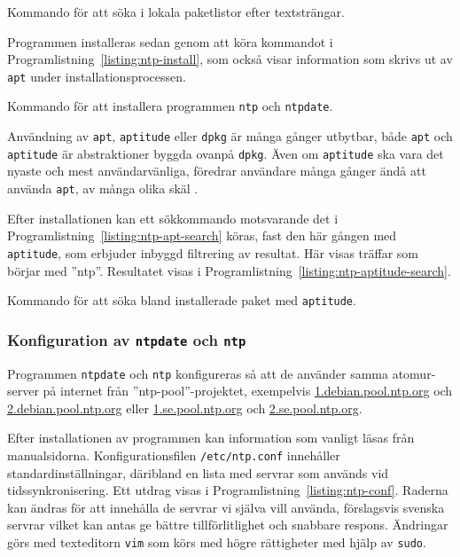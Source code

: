 \begin{listing}[H]
\caption{Kommando för att söka i lokala paketlistor efter textsträngar.}
\label{listing:ntp-apt-search}
\end{listing}


Programmen installeras sedan genom att köra kommandot i
Programlistning~\ref{listing:ntp-install}, som också visar information som skrivs
ut av \texttt{apt} under installationsprocessen.

\begin{listing}[H]
\caption{Kommando för att installera programmen \texttt{ntp} och \texttt{ntpdate}.}
\label{listing:ntp-install}
\end{listing}


Användning av \texttt{apt}, \texttt{aptitude} eller
\texttt{dpkg} är många gånger utbytbar, både \texttt{apt} och \texttt{aptitude}
är abstraktioner byggda ovanpå \texttt{dpkg}. Även om \texttt{aptitude} ska vara
det nyaste och mest användarvänliga, föredrar användare många gånger ändå
att använda \texttt{apt}, av många olika skäl \cite{superuser:aptitude-apt}.

Efter installationen kan ett sökkommando motsvarande det i
Programlistning~\ref{listing:ntp-apt-search} köras, fast den här gången med
\texttt{aptitude}, som erbjuder inbyggd filtrering av resultat. Här visas
träffar som börjar med ''ntp''. Resultatet visas i
Programlistning~\ref{listing:ntp-aptitude-search}.

\begin{listing}[H]
\caption{Kommando för att söka bland installerade paket med \texttt{aptitude}.}
\label{listing:ntp-aptitude-search}
\end{listing}

\subsubsection{Konfiguration av \texttt{ntpdate} och \texttt{ntp}}
Programmen \texttt{ntpdate} och \texttt{ntp} konfigureras så att de använder
samma atomur-server på internet från ''ntp-pool''-projektet, exempelvis
\url{1.debian.pool.ntp.org} och \url{2.debian.pool.ntp.org} eller
\url{1.se.pool.ntp.org} och \url{2.se.pool.ntp.org}.

Efter installationen av programmen kan information som vanligt läsas från
manualsidorna. Konfigurationsfilen \texttt{/etc/ntp.conf} innehåller
standardinställningar, däribland en lista med servrar som används vid
tidssynkronisering. Ett utdrag visas i Programlistning~\ref{listing:ntp-conf}.
Raderna kan ändras för att innehålla de servrar vi själva vill använda,
förslagsvis svenska servrar vilket kan antas ge bättre tillförlitlighet och
snabbare respons. Ändringar görs med texteditorn \texttt{vim} som körs med
högre rättigheter med hjälp av \texttt{sudo}.

